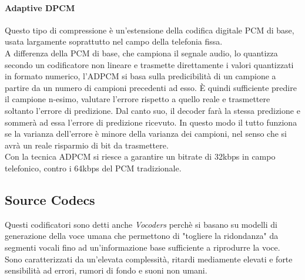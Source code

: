 \paragraph{Adaptive DPCM}
Questo tipo di compressione è un'estensione della codifica digitale PCM di base, usata largamente soprattutto nel campo della telefonia fissa.\\
A differenza della PCM di base, che campiona il segnale audio, lo quantizza secondo un codificatore non lineare e trasmette direttamente i valori quantizzati in formato numerico, l'ADPCM si basa sulla predicibilità di un campione a partire da un numero di campioni precedenti ad esso. È quindi sufficiente predire il campione n-esimo, valutare l'errore rispetto a quello reale e trasmettere soltanto l'errore di predizione. Dal canto suo, il decoder farà la stessa predizione e sommerà ad essa l'errore di predizione ricevuto. In questo modo il tutto funziona se la varianza dell'errore è minore della varianza dei campioni, nel senso che si avrà un reale risparmio di bit da trasmettere.\\
Con la tecnica ADPCM si riesce a garantire un bitrate di 32kbps in campo telefonico, contro i 64kbps del PCM tradizionale.

\subsection{Source Codecs}
Questi codificatori sono detti anche \textit{Vocoders} perchè si basano su modelli di generazione della voce umana che permettono di "togliere la ridondanza" da segmenti vocali fino ad un'informazione base sufficiente a riprodurre la voce.\\
Sono caratterizzati da un'elevata complessità, ritardi mediamente elevati e forte sensibilità ad errori, rumori di fondo e suoni non umani.